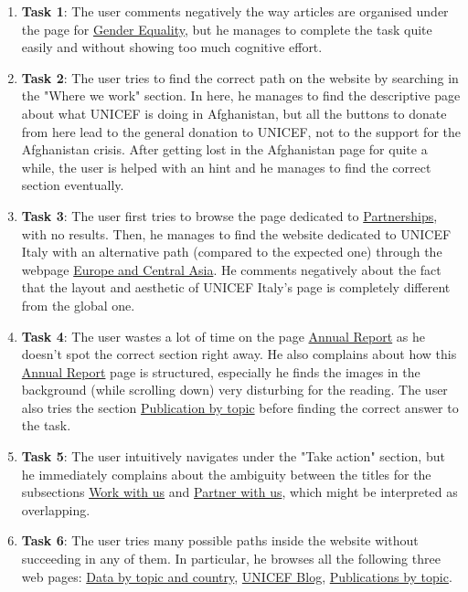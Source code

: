 \begin{enumerate}
	\item \textbf{Task 1}: The user comments negatively the way articles are organised under the page for \href{https://www.unicef.org/gender-equality}{Gender Equality}, but he manages to complete the task quite easily and without showing too much cognitive effort.
	\item \textbf{Task 2}: The user tries to find the correct path on the website by searching in the "Where we work" section. In here, he manages to find the descriptive page about what UNICEF is doing in Afghanistan, but all the buttons to donate from here lead to the general donation to UNICEF, not to the support for the Afghanistan crisis. After getting lost in the Afghanistan page for quite a while, the user is helped with an hint and he manages to find the correct section eventually.
	\item \textbf{Task 3}: The user first tries to browse the page dedicated to \href{https://www.unicef.org/partnerships}{Partnerships}, with no results. Then, he manages to find the website dedicated to UNICEF Italy with an alternative path (compared to the expected one) through the webpage \href{https://www.unicef.org/eca/}{Europe and Central Asia}. He comments negatively about the fact that the layout and aesthetic of UNICEF Italy's page is completely different from the global one.
	\item \textbf{Task 4}: The user wastes a lot of time on the page \href{https://www.unicef.org/reports/unicef-annual-report-2022}{Annual Report} as he doesn't spot the correct section right away. He also complains about how this \href{https://www.unicef.org/reports/unicef-annual-report-2022}{Annual Report} page is structured, especially he finds the images in the background (while scrolling down) very disturbing for the reading. The user also tries the section \href{https://www.unicef.org/reports}{Publication by topic} before finding the correct answer to the task.
	\item \textbf{Task 5}: The user intuitively navigates under the "Take action" section, but he immediately complains about the ambiguity between the titles for the subsections \href {https://www.unicef.org/careers/}{Work with us} and \href{https://www.unicef.org/partnerships}{Partner with us}, which might be interpreted as overlapping.
	\item \textbf{Task 6}: The user tries many possible paths inside the website without succeeding in any of them. In particular, he browses all the following three web pages: \href{https://data.unicef.org/?_gl=1\%2A1he5ywc\%2A_ga\%2AMTEzMTU1MTkxOS4xNzEwMTk2NDI2\%2A_ga_ZEPV2PX419\%2AMTcxMjYxMDM0Ni4yNi4xLjE3MTI2MTUzNDEuNjAuMC4w}{Data by topic and country}, \href{https://www.unicef.org/blog}{UNICEF Blog}, \href{https://www.unicef.org/reports}{Publications by topic}.
	
\end{enumerate}

